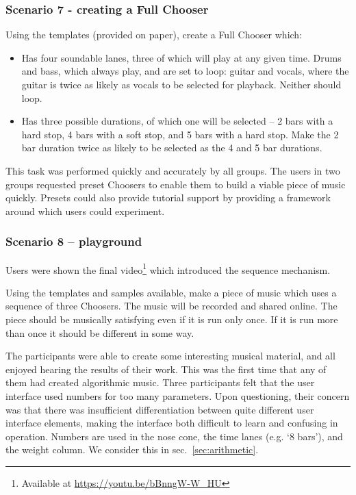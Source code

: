 \documentclass{ppig}
\begin{document}
\hypertarget{scenario-7---creating-a-full-chooser}{%
\subsubsection{Scenario 7 - creating a Full
Chooser}\label{scenario-7---creating-a-full-chooser}}

Using the templates (provided on paper), create a Full Chooser which:

\begin{itemize}
\item
  Has four soundable lanes, three of which will play at any given time.
  Drums and bass, which always play, and are set to loop: guitar and
  vocals, where the guitar is twice as likely as vocals to be selected
  for playback. Neither should loop.
\item
  Has three possible durations, of which one will be selected -- 2 bars
  with a hard stop, 4 bars with a soft stop, and 5 bars with a hard
  stop. Make the 2 bar duration twice as likely to be selected as the 4
  and 5 bar durations.
\end{itemize}

This task was performed quickly and accurately by all groups. The users
in two groups requested preset Choosers to enable them to build a viable
piece of music quickly. Presets could also provide tutorial support by
providing a framework around which users could experiment.

\hypertarget{scenario-8-playground}{%
\subsubsection{Scenario 8 -- playground}\label{scenario-8-playground}}

Users were shown the final video\footnote{Available at
  \url{https://youtu.be/bBnngW-W_HU}} which introduced the sequence
mechanism.

Using the templates and samples available, make a piece of music which
uses a sequence of three Choosers. The music will be recorded and shared
online. The piece should be musically satisfying even if it is run only
once. If it is run more than once it should be different in some way.

The participants were able to create some interesting musical material,
and all enjoyed hearing the results of their work. This was the first
time that any of them had created algorithmic music. Three participants
felt that the user interface used numbers for too many parameters. Upon
questioning, their concern was that there was insufficient
differentiation between quite different user interface elements, making
the interface both difficult to learn and confusing in operation.
Numbers are used in the nose cone, the time lanes (e.g. `8 bars'), and
the weight column. We consider this in sec.~\ref{sec:arithmetic}.
\end{document}
